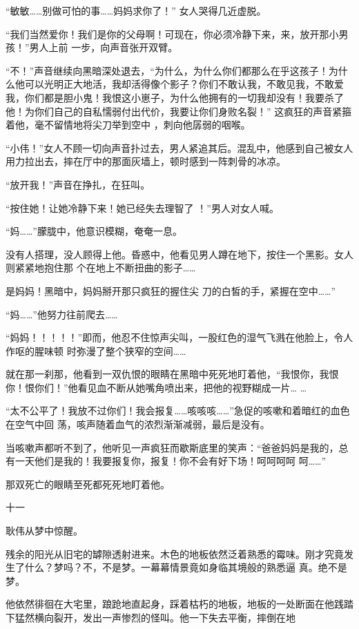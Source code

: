 \documentclass{article}
\begin{document}
“敏敏……别做可怕的事……妈妈求你了！”
女人哭得几近虚脱。 

“我们当然爱你！我们是你的父母啊！可现在，你必须冷静下来，来，放开那小男孩！”男人上前
一步，向声音张开双臂。 

“不！”声音继续向黑暗深处退去，“为什么，为什么你们都那么在乎这孩子！为什么他可以光明正大地活，我却活得像个影子？你们不敢认我，不敢见我，不敢爱我，你们都是胆小鬼！我恨这小崽子，为什么他拥有的一切我却没有！我要杀了他！为你们自己的自私懦弱付出代价，我要让你们身败名裂！”
\newpage
这疯狂的声音紧箍着他，毫不留情地将尖刀举到空中
，刺向他孱弱的咽喉。 

“小伟！”女人不顾一切向声音扑过去，男人紧追其后。混乱中，他感到自己被女人用力拉出去，摔在厅中的那面灰墙上，顿时感到一阵刺骨的冰凉。


“放开我！”声音在挣扎，在狂叫。 

“按住她！让她冷静下来！她已经失去理智了
！”男人对女人喊。 

“妈……”朦胧中，他意识模糊，奄奄一息。

没有人搭理，没人顾得上他。昏惑中，他看见男人蹲在地下，按住一个黑影。女人则紧紧地抱住那
个在地上不断扭曲的影子…… 

是妈妈！黑暗中，妈妈掰开那只疯狂的握住尖
刀的白皙的手，紧握在空中……” 

\newpage


“妈……”他努力往前爬去…… 

“妈妈！！！！！”即而，他忍不住惊声尖叫，一股红色的湿气飞溅在他脸上，令人作呕的腥味顿
时弥漫了整个狭窄的空间…… 

就在那一刹那，他看到一双仇恨的眼睛在黑暗中死死地盯着他，“我恨你，我恨你！恨你们！”他看见血不断从她嘴角喷出来，把他的视野糊成一片…
… 

“太不公平了！我放不过你们！我会报复……咳咳咳……”急促的咳嗽和着暗红的血色在空气中回
荡，咳声随着血气的浓烈渐渐减弱，最后是没有。 

当咳嗽声都听不到了，他听见一声疯狂而歇斯底里的笑声：“爸爸妈妈是我的，总有一天他们是我的！我要报复你，报复！你不会有好下场！呵呵呵呵
呵……” 


\newpage

那双死亡的眼睛至死都死死地盯着他。 


十一 


耿伟从梦中惊醒。 

残余的阳光从旧宅的罅隙透射进来。木色的地板依然泛着熟悉的霉味。刚才究竟发生了什么？梦吗？不，不是梦。一幕幕情景竟如身临其境般的熟悉逼
真。绝不是梦。 

他依然徘徊在大宅里，踉跄地直起身，踩着枯朽的地板，地板的一处断面在他践踏下猛然横向裂开，发出一声惨烈的怪叫。他一下失去平衡，摔倒在地
\end{document}
